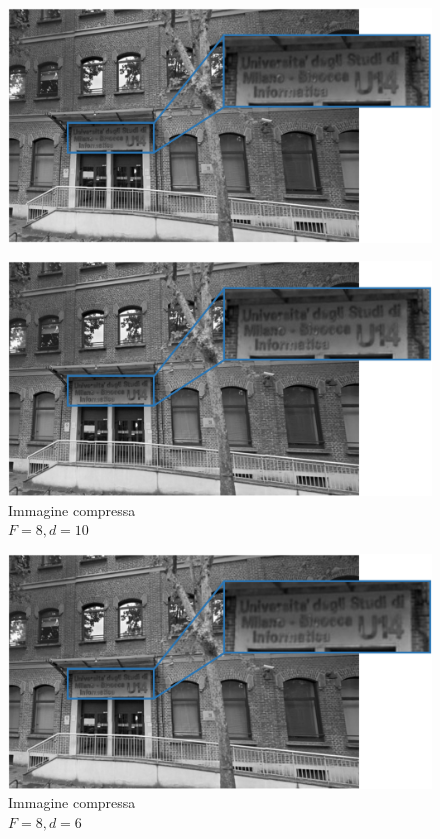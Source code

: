 \documentclass[preprint,12pt]{elsarticle}
\begin{document}
\begin{figure}[H]
	\includegraphics[width=\linewidth]{f1}
	\centering
\end{figure}

\begin{figure}[H]
	\includegraphics[width=\linewidth]{f2}
	\caption{Immagine compressa\\$F = 8, d = 10$}
	\centering
\end{figure}

\begin{figure}[H]
	\includegraphics[width=\linewidth]{f3}
	\caption{Immagine compressa\\$F = 8, d = 6$}
	\centering
\end{figure}
\end{document}
